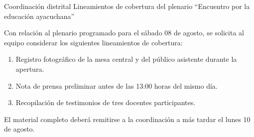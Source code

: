 \documentclass{memorando}
\begin{document}
\numerodocumento

  {Coordinación distrital}
  {Lineamientos de cobertura del plenario ``Encuentro por la educación
   ayacuchana''}

Con relación al plenario programado para el sábado 08 de agosto, se
solicita al equipo considerar los siguientes lineamientos de cobertura:

\begin{enumerate}
  \item Registro fotográfico de la mesa central y del público asistente
        durante la apertura.
  \item Nota de prensa preliminar antes de las 13:00 horas del mismo día.
  \item Recopilación de testimonios de tres docentes participantes.
\end{enumerate}

El material completo deberá remitirse a la coordinación a más tardar el
lunes 10 de agosto.

\atentamente
\bloquefirma[1.8cm]
\end{document}
